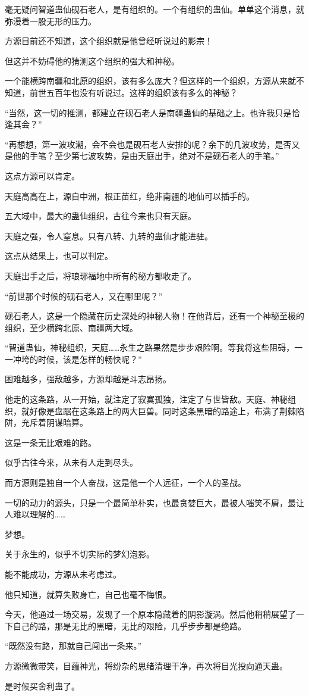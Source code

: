 \begin{this_body}
毫无疑问智道蛊仙砚石老人，是有组织的。一个有组织的蛊仙。单单这个消息，就弥漫着一股无形的压力。

方源目前还不知道，这个组织就是他曾经听说过的影宗！

但这并不妨碍他的猜测这个组织的强大和神秘。

一个能横跨南疆和北原的组织，该有多么庞大？但这样的一个组织，方源从来就不知道，前世五百年也没有听说过。这样的组织该有多么的神秘？

“当然，这一切的推测，都建立在砚石老人是南疆蛊仙的基础之上。也许我只是恰逢其会？”

“再想想，第一波攻潮，会不会也是砚石老人安排的呢？余下的几波攻势，是否又是他的手笔？至少第七波攻势，是由天庭出手，绝对不是砚石老人的手笔。”

这点方源可以肯定。

天庭高高在上，源自中洲，根正苗红，绝非南疆的地仙可以插手的。

五大域中，最大的蛊仙组织，古往今来也只有天庭。

天庭之强，令人窒息。只有八转、九转的蛊仙才能进驻。

这点从结果上，也可以判定。

天庭出手之后，将琅琊福地中所有的秘方都收走了。

“前世那个时候的砚石老人，又在哪里呢？”

砚石老人，这是一个隐藏在历史深处的神秘人物！在他背后，还有一个神秘至极的组织，至少横跨北原、南疆两大域。

“智道蛊仙，神秘组织，天庭……永生之路果然是步步艰险啊。等我将这些阻碍，一一冲垮的时候，该是怎样的畅快呢？”

困难越多，强敌越多，方源却越是斗志昂扬。

他走的这条路，从一开始，就注定了寂寞孤独，注定了与世皆敌。天庭、神秘组织，就好像是盘踞在这条路上的两大巨兽。同时这条黑暗的路途上，布满了荆棘陷阱，充斥着阴谋暗算。

这是一条无比艰难的路。

似乎古往今来，从未有人走到尽头。

而方源则是独自一个人奋战，这是他一个人远征，一个人的圣战。

一切的动力的源头，只是一个最简单朴实，也最贪婪巨大，最被人嗤笑不屑，最让人难以理解的……

梦想。

关于永生的，似乎不切实际的梦幻泡影。

能不能成功，方源从未考虑过。

他只知道，就算失败身亡，自己也毫不悔恨。

今天，他通过一场交易，发现了一个原本隐藏着的阴影漩涡。然后他稍稍展望了一下自己的路，那是无比的黑暗，无比的艰险，几乎步步都是绝路。

“既然没有路，那就自己闯出一条来。”

方源微微带笑，目蕴神光，将纷杂的思绪清理干净，再次将目光投向通天蛊。

是时候买舍利蛊了。

\end{this_body}

